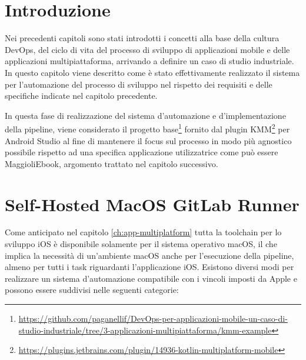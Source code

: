 
\section{Introduzione}
Nei precedenti capitoli sono stati introdotti i concetti alla base della cultura DevOps, 
del ciclo di vita del processo di sviluppo di applicazioni mobile e delle applicazioni multipiattaforma, 
arrivando a definire un caso di studio industriale. 
In questo capitolo viene descritto come è stato effettivamente realizzato il sistema per l'automazione del processo di sviluppo nel rispetto dei requisiti e delle specifiche indicate nel capitolo precedente.

In questa fase di realizzazione del sistema d'automazione e d'implementazione della pipeline,
viene considerato il progetto base\footnote{\href{https://github.com/paganellif/DevOps-per-applicazioni-mobile-un-caso-di-studio-industriale/tree/3-applicazioni-multipiattaforma/kmm-example}{https://github.com/paganellif/DevOps-per-applicazioni-mobile-un-caso-di-studio-industriale/tree/3-applicazioni-multipiattaforma/kmm-example}} fornito dal plugin KMM\footnote{\href{https://plugins.jetbrains.com/plugin/14936-kotlin-multiplatform-mobile}{https://plugins.jetbrains.com/plugin/14936-kotlin-multiplatform-mobile}} per Android Studio al fine di mantenere il focus sul processo in modo più agnostico possibile rispetto ad una specifica applicazione utilizzatrice come può essere MaggioliEbook, 
argomento trattato nel capitolo successivo.

\section{Self-Hosted MacOS GitLab Runner}
Come anticipato nel capitolo \ref{ch:app-multiplatform} tutta la toolchain per lo sviluppo iOS è disponibile solamente per il sistema operativo macOS, 
il che implica la necessità di un'ambiente macOS anche per l'esecuzione della pipeline, 
almeno per tutti i task riguardanti l'applicazione iOS. 
Esistono diversi modi per realizzare un sistema d'automazione compatibile con i vincoli imposti da Apple e possono essere suddivisi nelle seguenti categorie:

